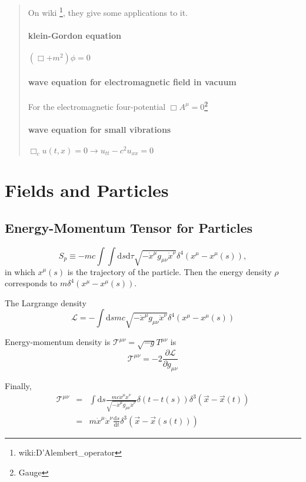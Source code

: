 \begin{quotation}
On wiki \footnote{wiki:D'Alembert\_operator}, they give some applications to it.
\paragraph{klein-Gordon equation} $(\Box+m^2)\phi=0$
\paragraph{wave equation for electromagnetic field in vacuum} For the electromagnetic four-potential $\Box A^\mu=0$\footnote{Gauge}
\paragraph{wave equation for small vibrations} $\Box_c u(t,x)=0\rightarrow u_{tt}-c^2 u_{xx}=0$
\end{quotation}




\section{Fields and Particles}

\subsection{Energy-Momentum Tensor for Particles}

\begin{equation}
S_p \equiv -m c \int \int \mathrm d s\mathrm d\tau \sqrt{-\dot x ^\mu g_{\mu\nu} \dot x^\nu} \delta^4(x^\mu - x^\mu (s))    ,
\end{equation}
in which $x^\mu(s)$ is the trajectory of the particle. Then the energy density $\rho$ corresponds to $m\delta^4(x^\mu- x^\mu(s))$.

The Largrange density
\begin{equation}
\mathcal L = -\int\mathrm ds mc \sqrt{-\dot x^\mu g_{\mu\nu}\dot x^\nu}\delta^4(x^\mu - x^\mu(s))
\end{equation}

Energy-momentum density is $\mathcal T^{\mu\nu} = \sqrt{-g}T^{\mu\nu}$ is
\begin{equation} 
\mathcal T^{\mu\nu} = -2 \frac{\partial \mathcal L}{\partial g_{\mu\nu}}
\end{equation}

Finally,
\begin{eqnarray}
\mathcal T^{\mu\nu} &=& \int \mathrm ds \frac{mc\dot x^\mu \dot x^\nu}{\sqrt{-\dot x^\mu g_{\mu\nu} \dot x^\nu}} \delta(t-t(s))\delta^3(\vec x - \vec x(t)) \\
&=& m\dot x^\mu \dot x^\nu \frac{\mathrm d s}{\mathrm d t} \delta^3(\vec x - \vec x(s(t)))
\end{eqnarray}






